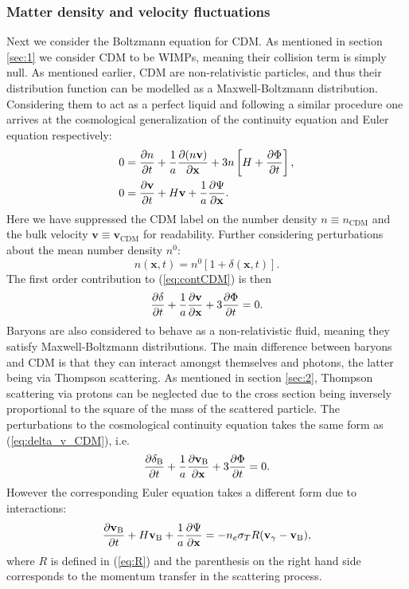 \documentclass[%
reprint,
 amsmath,amssymb,
 aps,
]{revtex4-2}
\begin{document}
\subsubsection{Matter density and velocity fluctuations}
Next we consider the Boltzmann equation for CDM. As mentioned in section \ref{sec:1} we consider CDM to be WIMPs, meaning their collision term is simply null. As mentioned earlier, CDM are non-relativistic particles, and thus their distribution function can be modelled as a Maxwell-Boltzmann distribution. Considering them to act as a perfect liquid and following a similar procedure one arrives at the cosmological generalization of the continuity equation and Euler equation respectively:
\begin{align}
	0&=\pdv{n}{t}+\frac{1}{a}\pdv{(n\textbf{v})}{\textbf{x}}+3n\left[H+\pdv{\Phi}{t}\right],
	\label{eq:contCDM}\\
	0&=\pdv{\textbf{v}}{t}+H\textbf{v}+\frac{1}{a}\pdv{\Psi}{\textbf{x}}.
\end{align}
Here we have suppressed the CDM label on the number density $n\equiv n_{\text{CDM}}$ and the bulk velocity $\textbf{v}\equiv \textbf{v}_\text{CDM}$ for readability. Further considering perturbations about the mean number density $n^0$:
\[n(\textbf{x},t)=n^0[1+\delta(\textbf{x},t)].\]
The first order contribution to (\ref{eq:contCDM}) is then
\begin{equation}
	\pdv{\delta}{t}+\frac{1}{a}\pdv{\textbf{v}}{\textbf{x}}+3\pdv{\Phi}{t}=0.
	\label{eq:delta_v_CDM}
\end{equation}
Baryons are also considered to behave as a non-relativistic fluid, meaning they satisfy Maxwell-Boltzmann distributions. The main difference between baryons and CDM is that they can interact amongst themselves and photons, the latter being via Thompson scattering. As mentioned in section \ref{sec:2}, Thompson scattering via protons can be neglected due to the cross section being inversely proportional to the square of the mass of the scattered particle. The perturbations to the cosmological continuity equation takes the same form as (\ref{eq:delta_v_CDM}), i.e.
\begin{equation}
	\pdv{\delta_\text{B}}{t}+\frac{1}{a}\pdv{\textbf{v}_\text{B}}{\textbf{x}}+3\pdv{\Phi}{t}=0.
	\label{eq:contB}
\end{equation}
However the corresponding Euler equation takes a different form due to interactions:
\begin{equation}
	\pdv{\textbf{v}_\text{B}}{t}+H\textbf{v}_\text{B}+\frac{1}{a}\pdv{\Psi}{\textbf{x}}=-n_e\sigma_T R(\textbf{v}_\gamma-\textbf{v}_\text{B}),
\end{equation}
where $R$ is defined in (\ref{eq:R}) and the parenthesis on the right hand side corresponds to the momentum transfer in the scattering process.
\end{document}
